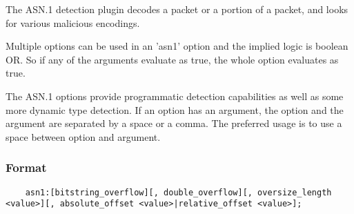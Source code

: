 \documentclass[english]{report}
\begin{document}
The ASN.1 detection plugin decodes a packet or a portion of a packet, and looks
for various malicious encodings.

Multiple options can be used in an 'asn1' option and the implied logic is
boolean OR.  So if any of the arguments evaluate as true, the whole option
evaluates as true.

The ASN.1 options provide programmatic detection capabilities as well as some
more dynamic type detection.  If an option has an argument, the option and the
argument are separated by a space or a comma.  The preferred usage is to use a
space between option and argument.

\subsubsection{Format}

\begin{verbatim}
    asn1:[bitstring_overflow][, double_overflow][, oversize_length <value>][, absolute_offset <value>|relative_offset <value>];
\end{verbatim}
\end{document}
